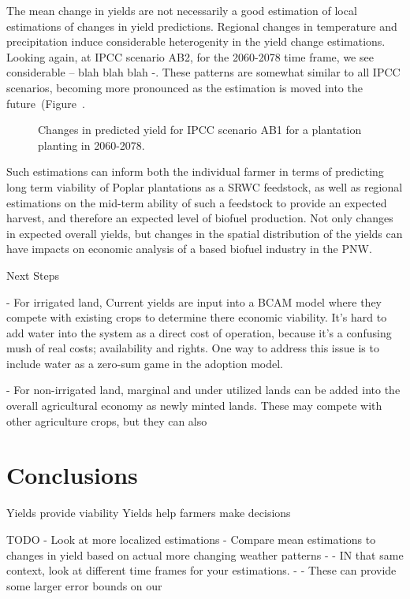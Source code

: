 \documentclass[preprint,12pt]{elsarticle}
\begin{document}
{The mean change in yields are not necessarily a good estimation of
local estimations of changes in yield predictions.  Regional changes
in temperature and precipitation induce considerable heterogenity in
the yield change estimations.  Looking again, at \ac{IPCC} scenario
\ac{AB2}, for the 2060-2078 time frame, we see considerable -- blah
blah blah -.  These patterns are somewhat similar to all \ac{IPCC}
scenarios, becoming more pronounced as the estimation is moved into
the future~(Figure~\cite{fig:new-change}.

\begin{figure}[hp]
  \centering
  
  \caption{Changes in predicted yield for \ac{IPCC} scenario \ac{AB1}
    for a plantation planting in 2060-2078.}
  \label{fig:land}
\end{figure}

Such estimations can inform both the individual farmer in terms of
predicting long term viability of Poplar plantations as a \ac{SRWC}
feedstock, as well as regional estimations on the mid-term ability of
such a feedstock to provide an expected harvest, and therefore an
expected level of biofuel production.  Not only changes in expected
overall yields, but changes in the spatial distribution of the yields
can have impacts on economic analysis of a  based biofuel
industry in the \ac{PNW}.  

Next Steps 

- For irrigated land, Current yields are input into a \ac{BCAM} model
where they compete with existing crops to determine there economic
viability.  It's hard to add water into the system as a direct cost of
operation, because it's a confusing mush of real costs; availability
and rights.  One way to address this issue is to include water as a
zero-sum game in the adoption model.

- For non-irrigated land, marginal and under utilized lands can be
added into the overall agricultural economy as newly minted lands.
These may compete with other agriculture crops, but they can also 

\section{Conclusions}
\label{sec:conclude}

Yields provide viability
Yields help farmers make decisions

TODO
- Look at more localized estimations
- Compare mean estimations to changes in yield based on actual more changing weather patterns
- - IN that same context, look at different time frames for your estimations. 
- - These can provide some larger error bounds on our 



}
\end{document}
